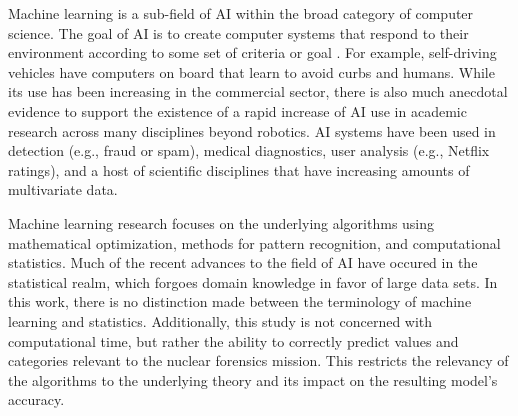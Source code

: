 Machine learning is a sub-field of \gls{AI} within the broad category of
computer science. The goal of \gls{AI} is to create computer systems that
respond to their environment according to some set of criteria or goal
\cite{changingml}. For example, self-driving vehicles have computers on board
that learn to avoid curbs and humans. While its use has been increasing in the
commercial sector, there is also much anecdotal evidence to support the
existence of a rapid increase of \gls{AI} use in academic research across many
disciplines beyond robotics. \gls{AI} systems have been used in detection
(e.g., fraud or spam), medical diagnostics, user analysis (e.g., Netflix
ratings), and a host of scientific disciplines that have increasing amounts of
multivariate data.

Machine learning research focuses on the underlying algorithms using
mathematical optimization, methods for pattern recognition, and computational
statistics.  Much of the recent advances to the field of \gls{AI} have occured
in the statistical realm, which forgoes domain knowledge in favor of large data
sets.  In this work, there is no distinction made between the terminology of
machine learning and statistics.  Additionally, this study is not concerned
with computational time, but rather the ability to correctly predict values and
categories relevant to the nuclear forensics mission. This restricts the
relevancy of the algorithms to the underlying theory and its impact on the
resulting model's accuracy. 

